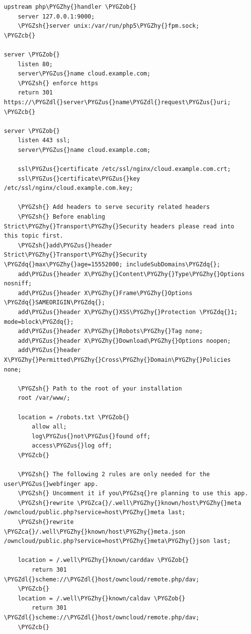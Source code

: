 \documentclass[letterpaper,10pt,english]{sphinxmanual}
\def\PYGZus{\char`\_}
\def\PYGZob{\char`\{}
\def\PYGZcb{\char`\}}
\def\PYGZca{\char`\^}
\def\PYGZsh{\char`\#}
\def\PYGZdl{\char`\$}
\def\PYGZhy{\char`\-}
\def\PYGZsq{\char`\'}
\def\PYGZdq{\char`\"}
\begin{document}
\begin{Verbatim}[commandchars=\\\{\}]
upstream php\PYGZhy{}handler \PYGZob{}
    server 127.0.0.1:9000;
    \PYGZsh{}server unix:/var/run/php5\PYGZhy{}fpm.sock;
\PYGZcb{}

server \PYGZob{}
    listen 80;
    server\PYGZus{}name cloud.example.com;
    \PYGZsh{} enforce https
    return 301 https://\PYGZdl{}server\PYGZus{}name\PYGZdl{}request\PYGZus{}uri;
\PYGZcb{}

server \PYGZob{}
    listen 443 ssl;
    server\PYGZus{}name cloud.example.com;

    ssl\PYGZus{}certificate /etc/ssl/nginx/cloud.example.com.crt;
    ssl\PYGZus{}certificate\PYGZus{}key /etc/ssl/nginx/cloud.example.com.key;

    \PYGZsh{} Add headers to serve security related headers
    \PYGZsh{} Before enabling Strict\PYGZhy{}Transport\PYGZhy{}Security headers please read into this topic first.
    \PYGZsh{}add\PYGZus{}header Strict\PYGZhy{}Transport\PYGZhy{}Security \PYGZdq{}max\PYGZhy{}age=15552000; includeSubDomains\PYGZdq{};
    add\PYGZus{}header X\PYGZhy{}Content\PYGZhy{}Type\PYGZhy{}Options nosniff;
    add\PYGZus{}header X\PYGZhy{}Frame\PYGZhy{}Options \PYGZdq{}SAMEORIGIN\PYGZdq{};
    add\PYGZus{}header X\PYGZhy{}XSS\PYGZhy{}Protection \PYGZdq{}1; mode=block\PYGZdq{};
    add\PYGZus{}header X\PYGZhy{}Robots\PYGZhy{}Tag none;
    add\PYGZus{}header X\PYGZhy{}Download\PYGZhy{}Options noopen;
    add\PYGZus{}header X\PYGZhy{}Permitted\PYGZhy{}Cross\PYGZhy{}Domain\PYGZhy{}Policies none;

    \PYGZsh{} Path to the root of your installation
    root /var/www/;

    location = /robots.txt \PYGZob{}
        allow all;
        log\PYGZus{}not\PYGZus{}found off;
        access\PYGZus{}log off;
    \PYGZcb{}

    \PYGZsh{} The following 2 rules are only needed for the user\PYGZus{}webfinger app.
    \PYGZsh{} Uncomment it if you\PYGZsq{}re planning to use this app.
    \PYGZsh{}rewrite \PYGZca{}/.well\PYGZhy{}known/host\PYGZhy{}meta /owncloud/public.php?service=host\PYGZhy{}meta last;
    \PYGZsh{}rewrite \PYGZca{}/.well\PYGZhy{}known/host\PYGZhy{}meta.json /owncloud/public.php?service=host\PYGZhy{}meta\PYGZhy{}json last;

    location = /.well\PYGZhy{}known/carddav \PYGZob{}
        return 301 \PYGZdl{}scheme://\PYGZdl{}host/owncloud/remote.php/dav;
    \PYGZcb{}
    location = /.well\PYGZhy{}known/caldav \PYGZob{}
        return 301 \PYGZdl{}scheme://\PYGZdl{}host/owncloud/remote.php/dav;
    \PYGZcb{}


\end{Verbatim}
\end{document}
